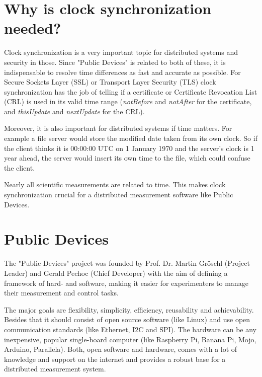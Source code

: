 
\section{Why is clock synchronization needed?}

Clock synchronization is a very important topic for distributed systems and security in those. Since "Public Devices" is related to both of these, it is indispensable to resolve time differences as fast and accurate as possible. For Secure Sockets Layer (SSL) or Transport Layer Security (TLS) clock synchronization has the job of telling if a certificate or Certificate Revocation List (CRL) is used in its valid time range (\textit{notBefore} and \textit{notAfter} for the certificate, and \textit{thisUpdate} and \textit{nextUpdate} for the CRL).

Moreover, it is also important for distributed systems if time matters. For example a file server would store the modified date taken from its own clock. So if the client thinks it is 00:00:00 UTC on 1 January 1970 and the server’s clock is 1 year ahead, the server would insert its own time to the file, which could confuse the client.

Nearly all scientific measurements are related to time. This makes clock synchronization crucial for a distributed measurement software like Public Devices.

\section{Public Devices}

The "Public Devices" project was founded by Prof. Dr. Martin Gröschl (Project Leader) and Gerald Pechoc (Chief Developer) with the aim of defining a framework of hard- and software, making it easier for experimenters to manage their measurement and control tasks.

The major goals are flexibility, simplicity, efficiency, reusability and achievability. Besides that it should consist of open source software (like Linux) and use open communication standards (like Ethernet, I2C and SPI). The hardware can be any inexpensive, popular single-board computer (like Raspberry Pi, Banana Pi, Mojo, Arduino, Parallela). Both, open software and hardware, comes with a lot of knowledge and support on the internet and provides a robust base for a distributed measurement system.


